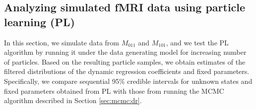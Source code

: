 %
%

\subsection{Analyzing simulated fMRI data using particle learning (PL) \label{sec:fmri:sim}}

In this section, we simulate data from $M_{011}$ and $M_{101}$, and we test the PL algorithm by running it under the data generating model for increasing number of particles. Based on the resulting particle samples, we obtain estimates of the filtered distributions of the dynamic regression coefficients and fixed parameters. Specifically, we compare sequential 95\% credible intervals for unknown states and fixed parameters obtained from PL with those from running the MCMC algorithm described in Section \ref{sec:mcmc:dr}.

